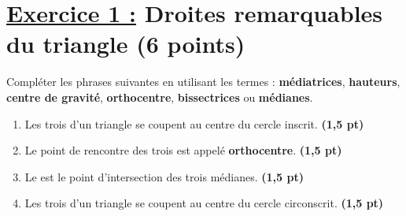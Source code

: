 \documentclass[12pt,a4paper]{article}
\begin{document}
\renewcommand{\arraystretch}{1.5}
\renewcommand{\arrayrulewidth}{1.2pt}
\vspace{3cm}

\section*{\underline{Exercice 1 :} Droites remarquables du triangle (6 points)}

Compléter les phrases suivantes en utilisant les termes : \textbf{médiatrices}, \textbf{hauteurs}, \textbf{centre de gravité}, \textbf{orthocentre}, \textbf{bissectrices} ou \textbf{médianes}.

\begin{enumerate}
    \item Les trois \dotfill d'un triangle se coupent au centre du cercle inscrit. \hfill \textbf{(1,5 pt)}
    \item Le point de rencontre des trois \dotfill est appelé \textbf{orthocentre}. \hfill \textbf{(1,5 pt)}
    \item Le \dotfill est le point d'intersection des trois médianes. \hfill \textbf{(1,5 pt)}
    \item Les trois \dotfill d'un triangle se coupent au centre du cercle circonscrit. \hfill \textbf{(1,5 pt)}
\end{enumerate}
\end{document}
